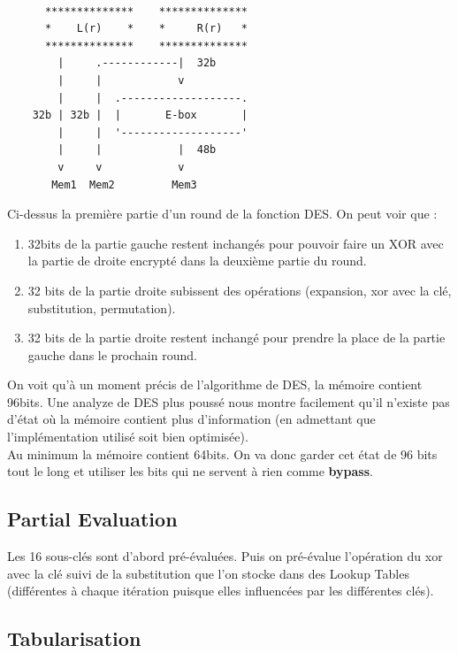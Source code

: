 \documentclass[a4paper,12pt]{article}
\begin{document}
\begin{Verbatim}

      **************    **************
      *    L(r)    *    *     R(r)   *
      **************    **************
        |     .------------|  32b
        |     |            v
        |     |  .-------------------.
    32b | 32b |  |       E-box       |
        |     |  '-------------------'
        |     |            |  48b
        v     v            v
       Mem1  Mem2         Mem3
\end{Verbatim}

Ci-dessus la première partie d'un round de la fonction DES. On peut voir que :

\begin{enumerate}
\item 32bits de la partie gauche restent inchangés pour pouvoir faire un XOR avec la partie de droite encrypté dans la deuxième partie du round.
\item 32 bits de la partie droite subissent des opérations (expansion, xor avec la clé, substitution, permutation).
\item 32 bits de la partie droite restent inchangé pour prendre la place de la partie gauche dans le prochain round.
\end{enumerate}

On voit qu'à un moment précis de l'algorithme de DES, la mémoire contient 96bits. Une analyze de DES plus poussé nous montre facilement qu'il n'existe pas d'état où la mémoire contient plus d'information (en admettant que l'implémentation utilisé soit bien optimisée).\\
Au minimum la mémoire contient 64bits. On va donc garder cet état de 96 bits tout le long et utiliser les bits qui ne servent à rien comme \textbf{bypass}.\\


\subsection{Partial Evaluation}

Les 16 sous-clés sont d'abord pré-évaluées. Puis on pré-évalue l'opération du xor avec la clé suivi de la substitution que l'on stocke dans des Lookup Tables (différentes à chaque itération puisque elles influencées par les différentes clés).


\subsection{Tabularisation}
\end{document}
